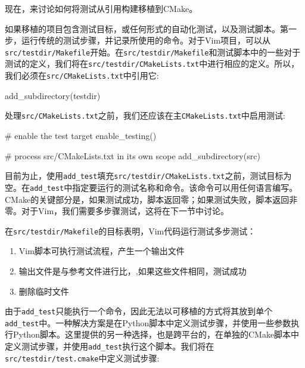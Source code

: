 现在，来讨论如何将测试从引用构建移植到CMake。


如果移植的项目包含测试目标，或任何形式的自动化测试，以及测试脚本。第一步，运行传统的测试步骤，并记录所使用的命令。对于Vim项目，可以从\texttt{src/testdir/Makefile}开始。在\texttt{src/testdir/Makefile}和测试脚本中的一些对于测试的定义，我们将在\texttt{src/testdir/CMakeLists.txt}中进行相应的定义。所以，我们必须在\texttt{src/CMakeLists.txt}中引用它:

\begin{codebox}[cmake]
add_subdirectory(testdir)
\end{codebox}

处理\texttt{src/CMakeLists.txt}之前，我们还应该在主\texttt{CMakeLists.txt}中启用测试:

\begin{codebox}[cmake]
# enable the test target
enable_testing()

# process src/CMakeLists.txt in its own scope
add_subdirectory(src)
\end{codebox}

目前为止，使用\texttt{add\_test}填充\texttt{src/testdir/CMakeLists.txt}之前，测试目标为空。在\texttt{add\_test}中指定要运行的测试名称和命令。该命令可以用任何语言编写。CMake的关键部分是，如果测试成功，脚本返回零；如果测试失败，脚本返回非零。对于Vim，我们需要多步骤测试，这将在下一节中讨论。


在\texttt{src/testdir/Makefile}的目标表明，Vim代码运行测试多步测试：

\begin{enumerate}
\item Vim脚本可执行测试流程，产生一个输出文件

\item 输出文件是与参考文件进行比，,如果这些文件相同，测试成功

\item 删除临时文件

\end{enumerate}

由于\texttt{add\_test}只能执行一个命令，因此无法以可移植的方式将其放到单个\texttt{add\_test}中。一种解决方案是在Python脚本中定义测试步骤，并使用一些参数执行Python脚本。这里提供的另一种选择，也是跨平台的，在单独的CMake脚本中定义测试步骤，并使用\texttt{add\_test}执行这个脚本。我们将在\texttt{src/testdir/test.cmake}中定义测试步骤:

